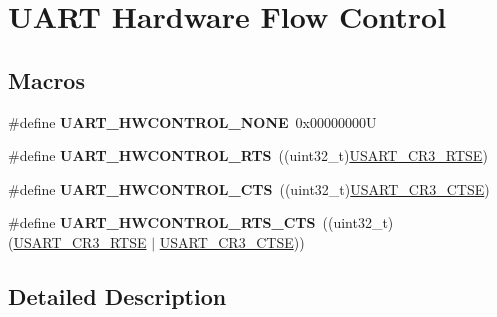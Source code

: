 \hypertarget{group___u_a_r_t___hardware___flow___control}{}\section{U\+A\+RT Hardware Flow Control}
\label{group___u_a_r_t___hardware___flow___control}
\subsection*{Macros}
\begin{DoxyCompactItemize}
\item 
\mbox{\label{group___u_a_r_t___hardware___flow___control_gae0569001c06b7760cd38c481f84116cf}} 
\#define {\bfseries U\+A\+R\+T\+\_\+\+H\+W\+C\+O\+N\+T\+R\+O\+L\+\_\+\+N\+O\+NE}~0x00000000U
\item 
\mbox{\label{group___u_a_r_t___hardware___flow___control_ga6d5dad09c6abf30f252084ba0f8c0b7d}} 
\#define {\bfseries U\+A\+R\+T\+\_\+\+H\+W\+C\+O\+N\+T\+R\+O\+L\+\_\+\+R\+TS}~((uint32\+\_\+t)\mbox{\hyperlink{group___peripheral___registers___bits___definition_ga7c5d6fcd84a4728cda578a0339b4cac2}{U\+S\+A\+R\+T\+\_\+\+C\+R3\+\_\+\+R\+T\+SE}})
\item 
\mbox{\label{group___u_a_r_t___hardware___flow___control_ga352f517245986e3b86bc75f8472c51ea}} 
\#define {\bfseries U\+A\+R\+T\+\_\+\+H\+W\+C\+O\+N\+T\+R\+O\+L\+\_\+\+C\+TS}~((uint32\+\_\+t)\mbox{\hyperlink{group___peripheral___registers___bits___definition_gaa125f026b1ca2d76eab48b191baed265}{U\+S\+A\+R\+T\+\_\+\+C\+R3\+\_\+\+C\+T\+SE}})
\item 
\mbox{\label{group___u_a_r_t___hardware___flow___control_ga7c91698e8f08ba7ed3f2a0ba9aa27d73}} 
\#define {\bfseries U\+A\+R\+T\+\_\+\+H\+W\+C\+O\+N\+T\+R\+O\+L\+\_\+\+R\+T\+S\+\_\+\+C\+TS}~((uint32\+\_\+t)(\mbox{\hyperlink{group___peripheral___registers___bits___definition_ga7c5d6fcd84a4728cda578a0339b4cac2}{U\+S\+A\+R\+T\+\_\+\+C\+R3\+\_\+\+R\+T\+SE}} $\vert$ \mbox{\hyperlink{group___peripheral___registers___bits___definition_gaa125f026b1ca2d76eab48b191baed265}{U\+S\+A\+R\+T\+\_\+\+C\+R3\+\_\+\+C\+T\+SE}}))
\end{DoxyCompactItemize}


\subsection{Detailed Description}
